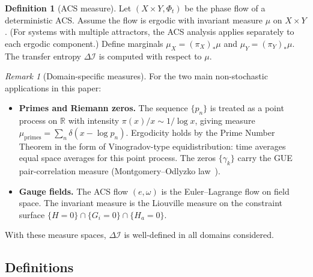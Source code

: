 \documentclass[12pt,a4paper]{article}
\theoremstyle{plain}
\theoremstyle{definition}
\newtheorem{definition}[theorem]{Definition}
\theoremstyle{remark}
\newtheorem{remark}[theorem]{Remark}
\newcommand{\DI}{\Delta\mathcal{I}}
\begin{document}
\begin{definition}[ACS measure]\label{def:acs-measure}
Let $(X \times Y, \Phi_t)$ be the phase flow of a deterministic ACS.
Assume the flow is ergodic with invariant measure $\mu$ on $X \times Y$.
(For systems with multiple attractors, the ACS analysis applies
separately to each ergodic component.)
Define marginals $\mu_X = (\pi_X)_*\mu$ and $\mu_Y = (\pi_Y)_*\mu$.
The transfer entropy $\DI$ is computed with respect to $\mu$.
\end{definition}

\begin{remark}[Domain-specific measures]
For the two main non-stochastic applications in this paper:
\begin{itemize}[noitemsep]
  \item \textbf{Primes and Riemann zeros.}  The sequence $\{p_n\}$ is treated
    as a point process on $\mathbb{R}$ with intensity $\pi(x)/x \sim 1/\log x$,
    giving measure $\mu_{\mathrm{primes}} = \sum_n \delta(x - \log p_n)$.
    Ergodicity holds by the Prime Number Theorem in the form of Vinogradov-type
    equidistribution: time averages equal space averages for this point process.
    The zeros $\{\gamma_k\}$ carry the GUE pair-correlation measure
    (Montgomery--Odlyzko law~\cite{Montgomery1973,Odlyzko1987}).
  \item \textbf{Gauge fields.}  The ACS flow $(e, \omega)$ is the
    Euler--Lagrange flow on field space.  The invariant measure is the
    Liouville measure on the constraint surface
    $\{H = 0\} \cap \{G_i = 0\} \cap \{H_a = 0\}$.
\end{itemize}
With these measure spaces, $\DI$ is well-defined in all domains considered.
\end{remark}

\subsection{Definitions}
\end{document}
